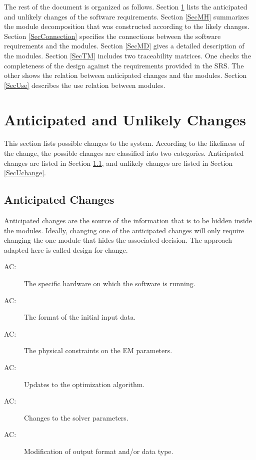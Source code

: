 \documentclass[12pt, titlepage]{article}
\newcounter{acnum}
\newcommand{\actheacnum}{AC\theacnum}
\begin{document}
The rest of the document is organized as follows. Section
\ref{SecChange} lists the anticipated and unlikely changes of the software
requirements. Section \ref{SecMH} summarizes the module decomposition that
was constructed according to the likely changes. Section \ref{SecConnection}
specifies the connections between the software requirements and the
modules. Section \ref{SecMD} gives a detailed description of the
modules. Section \ref{SecTM} includes two traceability matrices. One checks
the completeness of the design against the requirements provided in the SRS. The
other shows the relation between anticipated changes and the modules. Section
\ref{SecUse} describes the use relation between modules.

\section{Anticipated and Unlikely Changes} \label{SecChange}

This section lists possible changes to the system. According to the likeliness
of the change, the possible changes are classified into two
categories. Anticipated changes are listed in Section \ref{SecAchange}, and
unlikely changes are listed in Section \ref{SecUchange}.

\subsection{Anticipated Changes} \label{SecAchange}

Anticipated changes are the source of the information that is to be hidden
inside the modules. Ideally, changing one of the anticipated changes will only
require changing the one module that hides the associated decision. The approach
adapted here is called design for
change.

\begin{description}
\item[ \actheacnum \label{acHardware}:] The specific
  hardware on which the software is running.
\item[ \actheacnum \label{acInput}:] The format of the
  initial input data.
\item[ \actheacnum \label{acPhysParams}:] The physical constraints on the EM parameters.
\item[ \actheacnum \label{acAlgUpd}:] Updates to the optimization algorithm. 
\item[ \actheacnum \label{acParams}:] Changes to the solver parameters.
\item[ \actheacnum \label{acOutputFormat}:] Modification of output format and/or data type. 
\end{description}
\end{document}
